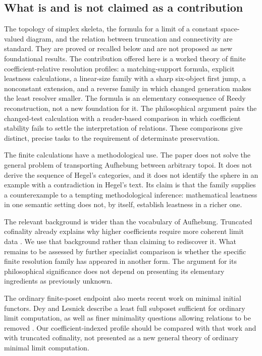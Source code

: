 \subsection{What is and is not claimed as a contribution}

The topology of simplex skeleta, the formula for a limit of a constant
space-valued diagram, and the relation between truncation and connectivity are
standard. They are proved or recalled below and are not proposed as new
foundational results. The contribution offered here is a worked theory of finite
coefficient-relative resolution profiles: a matching-support formula,
explicit leastness calculations, a linear-size family with a sharp
six-object first jump, a nonconstant extension, and a reverse family
in which changed generation makes the least resolver smaller. The formula is an
elementary consequence of Reedy reconstruction, not a new foundation for
it. The philosophical argument pairs the changed-test calculation with
a reader-based comparison in which coefficient stability fails to settle
the interpretation of relations. These comparisons give distinct,
precise tasks to the requirement of determinate preservation.

The finite calculations have a methodological use. The paper
does not solve the general problem of transporting Aufhebung between arbitrary
topoi. It does not derive the sequence of Hegel's categories, and it does not
identify the sphere in an example with a contradiction in Hegel's text. Its
claim is that the family supplies a counterexample to a tempting methodological
inference: mathematical leastness in one semantic setting does not, by itself,
establish leastness in a richer one.

The relevant background is wider than the vocabulary of Aufhebung.
Truncated cofinality already explains why higher coefficients require more
coherent limit data \cite{Du}. We use that background rather than claiming to
rediscover it. What remains to be assessed by further specialist comparison is
whether the specific finite resolution family has appeared in another form.
The argument for its philosophical significance does not depend on presenting
its elementary ingredients as previously unknown.

The ordinary finite-poset endpoint also meets recent work on minimal initial
functors. Dey and Lesnick describe a least full subposet sufficient for
ordinary limit computation, as well as finer minimality questions allowing
relations to be removed \cite{DeyLesnick}. Our coefficient-indexed profile
should be compared with that work and with truncated cofinality, not
presented as a new general theory of ordinary minimal limit computation.

